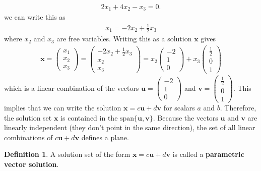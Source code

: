 \documentclass[
]{book}
\theoremstyle{definition}
\newtheorem{definition}{Definition}[chapter]
\theoremstyle{definition}
\theoremstyle{definition}
\theoremstyle{definition}
\theoremstyle{remark}
\begin{document}
\[
\begin{aligned}
2x_1 + 4 x_2 - x_3 = 0.
\end{aligned}
\]
we can write this as
\[
\begin{aligned}
x_1 = -2 x_2 + \frac{1}{2} x_3
\end{aligned}
\]
where \(x_2\) and \(x_3\) are free variables. Writing this as a solution \(\mathbf{x}\) gives
\[
\begin{aligned}
\mathbf{x} = \begin{pmatrix} x_1 \\ x_2 \\ x_3 \end{pmatrix} = \begin{pmatrix} -2 x_2 + \frac{1}{2} x_3 \\ x_2 \\ x_3 \end{pmatrix} = 
x_2 \begin{pmatrix} -2 \\ 1 \\ 0 \end{pmatrix} + 
x_3 \begin{pmatrix} \frac{1}{2} \\ 0 \\ 1 \end{pmatrix}
\end{aligned}
\]
which is a linear combination of the vectors \(\mathbf{u} = \begin{pmatrix} -2 \\ 1 \\ 0 \end{pmatrix}\) and \(\mathbf{v} = \begin{pmatrix} \frac{1}{2} \\ 0 \\ 1 \end{pmatrix}\). This implies that we can write the solution \(\mathbf{x} = c \mathbf{u} + d \mathbf{v}\) for scalars \(a\) and \(b\). Therefore, the solution set \(\mathbf{x}\) is contained in the \(\mbox{span}\{\mathbf{u}, \mathbf{v}\}\). Because the vectors \(\mathbf{u}\) and \(\mathbf{v}\) are linearly independent (they don't point in the same direction), the set of all linear combinations of \(c \mathbf{u} + d \mathbf{v}\) defines a plane.

\begin{definition}
A solution set of the form \(\mathbf{x} = c \mathbf{u} + d \mathbf{v}\) is called a \textbf{parametric vector solution}.
\end{definition}
\end{document}

